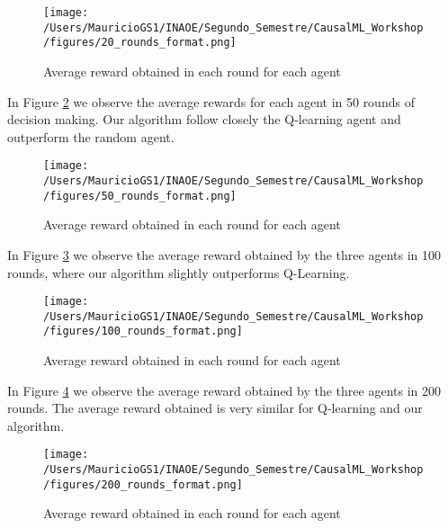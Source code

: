 \documentclass{article}
\begin{document}
\begin{figure}[ht]
\vskip 0.2in
\begin{center}
\centerline{\texttt{[image: /Users/MauricioGS1/INAOE/Segundo\_Semestre/CausalML\_Workshop/figures/20\_rounds\_format.png]}}
\caption{Average reward obtained in each round for each agent}
\label{20_rounds}
\end{center}
\vskip -0.2in
\end{figure}


In Figure \ref{50_rounds} we observe the average rewards for each agent in 50 rounds of decision making. Our algorithm follow closely the Q-learning agent and outperform the random agent.

\begin{figure}[ht]
\vskip 0.2in
\begin{center}
\centerline{\texttt{[image: /Users/MauricioGS1/INAOE/Segundo\_Semestre/CausalML\_Workshop/figures/50\_rounds\_format.png]}}
\caption{Average reward obtained in each round for each agent}
\label{50_rounds}
\end{center}
\vskip -0.2in
\end{figure}

In Figure \ref{100_rounds} we observe the average reward obtained by the three agents in 100 rounds, where our algorithm slightly outperforms Q-Learning.

\begin{figure}[ht]
\vskip 0.2in
\begin{center}
\centerline{\texttt{[image: /Users/MauricioGS1/INAOE/Segundo\_Semestre/CausalML\_Workshop/figures/100\_rounds\_format.png]}}
\caption{Average reward obtained in each round for each agent}
\label{100_rounds}
\end{center}
\vskip -0.2in
\end{figure}

In Figure \ref{200_rounds} we observe the average reward obtained by the three agents in 200 rounds. The average reward obtained is very similar for Q-learning and our algorithm.

\begin{figure}[ht]
\vskip 0.2in
\begin{center}
\centerline{\texttt{[image: /Users/MauricioGS1/INAOE/Segundo\_Semestre/CausalML\_Workshop/figures/200\_rounds\_format.png]}}
\caption{Average reward obtained in each round for each agent}
\label{200_rounds}
\end{center}
\vskip -0.2in
\end{figure}
\end{document}
